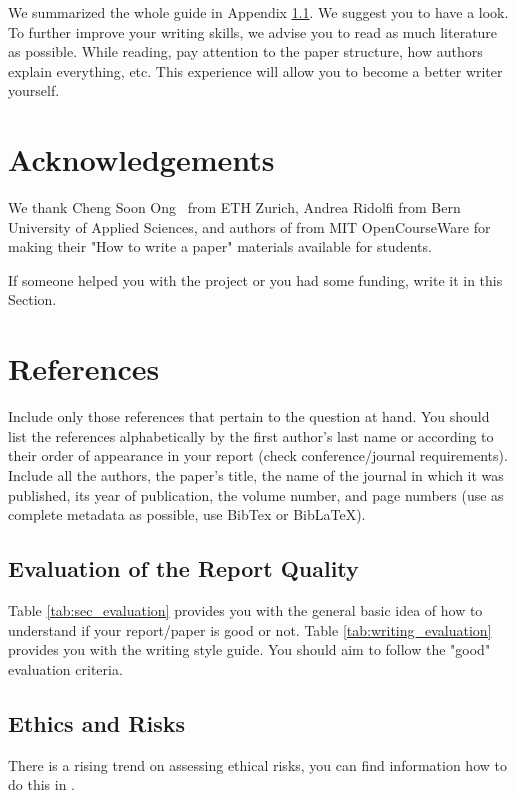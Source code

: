 \documentclass[10pt,conference,compsocconf]{IEEEtran}
\begin{document}
We summarized the whole guide in Appendix \ref{sec:evaluation}. We suggest you to have a look. To further improve your writing skills, we advise you to read as much literature as possible. While reading, pay attention to the paper structure, how authors explain everything, etc. This experience will allow you to become a better writer yourself.

\section{Acknowledgements}\label{sec:acknowledgements}
We thank Cheng Soon Ong~\cite{ethz} from ETH Zurich, Andrea Ridolfi from Bern University of Applied Sciences, and authors of \cite{mitGuidelinesWriting} from MIT OpenCourseWare for making their "How to write a paper" materials available for students.

 If someone helped you with the project or you had some funding, write it in this Section.

\section*{References}
Include only those references that pertain to the question at hand. You should list the references alphabetically by the first author’s last name or according to their order of appearance in your report (check conference/journal requirements). Include all the authors, the paper’s title, the name of the journal in which it was published, its year of publication, the volume number, and page numbers (use as complete metadata as possible, use BibTex or BibLaTeX).




\appendix
\subsection{Evaluation of the Report Quality}\label{sec:evaluation}
Table \ref{tab:sec_evaluation} provides you with the general basic idea of how to understand if your report/paper is good or not. Table \ref{tab:writing_evaluation} provides you with the writing style guide. You should aim to follow the "good" evaluation criteria.

\subsection{Ethics and Risks}\label{sec:ethics}
There is a rising trend on assessing ethical risks, you can find information how to do this in \cite{hardebolle2023digital}.
\end{document}
